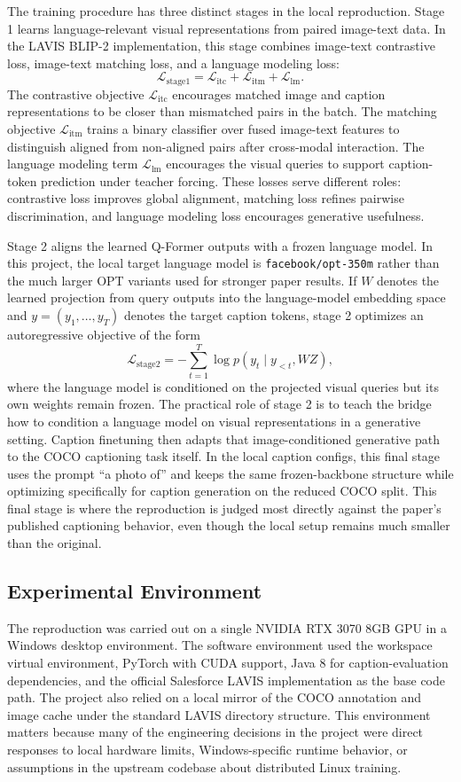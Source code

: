 \documentclass[11pt]{article}
\begin{document}
The training procedure has three distinct stages in the local reproduction. Stage 1 learns language-relevant visual representations from paired image-text data. In the LAVIS BLIP-2 implementation, this stage combines image-text contrastive loss, image-text matching loss, and a language modeling loss:
\[
\mathcal{L}_{\text{stage1}} =
\mathcal{L}_{\text{itc}} +
\mathcal{L}_{\text{itm}} +
\mathcal{L}_{\text{lm}}.
\]
The contrastive objective $\mathcal{L}_{\text{itc}}$ encourages matched image and caption representations to be closer than mismatched pairs in the batch. The matching objective $\mathcal{L}_{\text{itm}}$ trains a binary classifier over fused image-text features to distinguish aligned from non-aligned pairs after cross-modal interaction. The language modeling term $\mathcal{L}_{\text{lm}}$ encourages the visual queries to support caption-token prediction under teacher forcing. These losses serve different roles: contrastive loss improves global alignment, matching loss refines pairwise discrimination, and language modeling loss encourages generative usefulness.

Stage 2 aligns the learned Q-Former outputs with a frozen language model. In this project, the local target language model is \texttt{facebook/opt-350m} rather than the much larger OPT variants used for stronger paper results. If $W$ denotes the learned projection from query outputs into the language-model embedding space and $y=(y_1,\dots,y_T)$ denotes the target caption tokens, stage 2 optimizes an autoregressive objective of the form
\[
\mathcal{L}_{\text{stage2}} = - \sum_{t=1}^{T} \log p(y_t \mid y_{<t}, WZ),
\]
where the language model is conditioned on the projected visual queries but its own weights remain frozen. The practical role of stage 2 is to teach the bridge how to condition a language model on visual representations in a generative setting. Caption finetuning then adapts that image-conditioned generative path to the COCO captioning task itself. In the local caption configs, this final stage uses the prompt ``a photo of'' and keeps the same frozen-backbone structure while optimizing specifically for caption generation on the reduced COCO split. This final stage is where the reproduction is judged most directly against the paper's published captioning behavior, even though the local setup remains much smaller than the original.

\subsection{Experimental Environment}
The reproduction was carried out on a single NVIDIA RTX 3070 8GB GPU in a Windows desktop environment. The software environment used the workspace virtual environment, PyTorch with CUDA support, Java 8 for caption-evaluation dependencies, and the official Salesforce LAVIS implementation as the base code path. The project also relied on a local mirror of the COCO annotation and image cache under the standard LAVIS directory structure. This environment matters because many of the engineering decisions in the project were direct responses to local hardware limits, Windows-specific runtime behavior, or assumptions in the upstream codebase about distributed Linux training.
\end{document}
